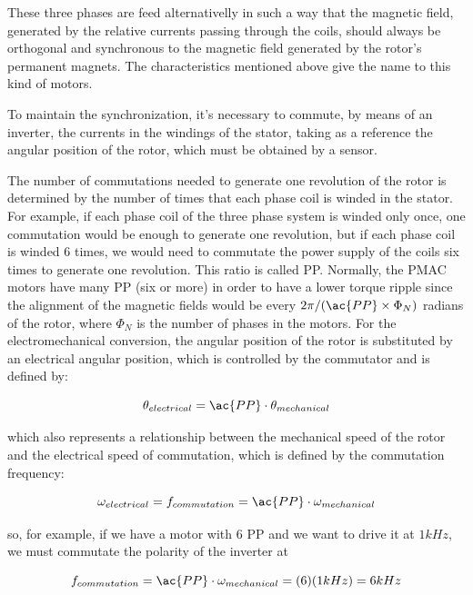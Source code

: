 These three phases are feed alternativelly in such a way that the magnetic field, generated by the relative currents passing through the coils, should always be orthogonal and synchronous to the magnetic field generated by the rotor's permanent magnets. The characteristics mentioned above give the name to this kind of motors. 

To maintain the synchronization, it's necessary to commute, by means of an inverter, the currents in the windings of the stator, taking as a reference the angular position of the rotor, which must be obtained by a sensor.

The number of commutations needed to generate one revolution of the rotor is determined by the number of times that each phase coil is winded in the stator. For example, if each phase coil of the three phase system is winded only once, one commutation would be enough to generate one revolution, but if each phase coil is winded 6 times, we would need to commutate the power supply of the coils six times to generate one revolution. This ratio is called \acf{PP}. Normally, the \ac{PMAC} motors have many \ac{PP} (six or more) in order to have a lower torque ripple since the alignment of the magnetic fields would be every $2 \pi/(\ac{PP} \times \Phi_{N})$ radians of the rotor, where $\Phi_{N}$ is the number of phases in the motors. For the electromechanical conversion, the angular position of the rotor is substituted by an electrical angular position, which is controlled by the commutator and is defined by:

\begin{equation}
	\label{eq:pole_pairs}
	\theta_{electrical} = \ac{PP} \cdot \theta_{mechanical}
\end{equation}

which also represents a relationship between the mechanical speed of the rotor and the electrical speed of commutation, which is defined by the commutation frequency:

\begin{equation}
	\label{eq:pole_pairs}
	\omega_{electrical} = f_{commutation} = \ac{PP} \cdot \omega_{mechanical}
\end{equation}

so, for example, if we have a motor with 6 \ac{PP} and we want to drive it at $1 kHz$, we must commutate the polarity of the inverter at 

\begin{equation}
	f_{commutation} = \ac{PP} \cdot \omega_{mechanical} = (6) (1 kHz) = 6 kHz
\end{equation}

